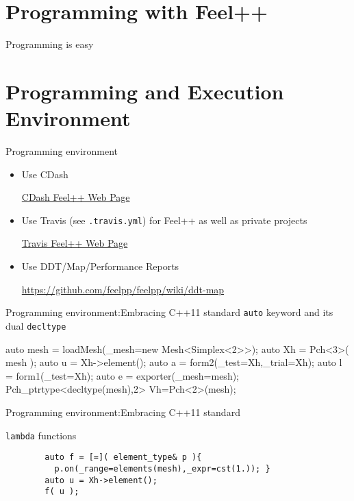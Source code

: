 \section{Programming with Feel++}
\begin{frame}{Programming is easy}

\end{frame}


\section{Programming and Execution Environment}


\begin{frame}{Programming environment}
  \begin{itemize}
  \item Use CDash
    \centerline{\href{http://my.cdash.org/index.php?project=Feel\%2B\%2B&display=project}{CDash
        Feel++ Web Page}}
  \item  Use Travis (see \texttt{.travis.yml}) for Feel++ as well as
    private projects
    \centerline{\href{https://travis-ci.org/feelpp/feelpp}{Travis
        Feel++ Web Page}}
  \item Use DDT/Map/Performance Reports
    \centerline{\url{https://github.com/feelpp/feelpp/wiki/ddt-map}}
  \end{itemize}
\end{frame}

\begin{frame}[fragile]{Programming environment:Embracing C++11 standard }
    \texttt{auto} keyword and its dual
    \texttt{decltype}
    \begin{cppcode}
      auto mesh = loadMesh(_mesh=new Mesh<Simplex<2>>);
      auto Xh = Pch<3>( mesh );
      auto u = Xh->element();
      auto a = form2(_test=Xh,_trial=Xh);
      auto l = form1(_test=Xh);
      auto e = exporter(_mesh=mesh);
      Pch_ptrtype<decltype(mesh),2> Vh=Pch<2>(mesh);
    \end{cppcode}
\end{frame}

\begin{frame}[fragile]{Programming environment:Embracing C++11 standard }

    \texttt{lambda} functions

      \begin{verbatim}
        auto f = [=]( element_type& p ){
          p.on(_range=elements(mesh),_expr=cst(1.)); }
        auto u = Xh->element();
        f( u );
      \end{verbatim}
\end{frame}

